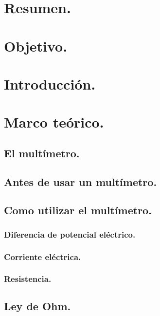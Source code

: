 \documentclass[10pt]{article}
\begin{document}
\tableofcontents
\newpage

\section{Resumen.}


\begin{multicols}{2}

\section{Objetivo.}



\section{Introducción.}



\section{Marco teórico.}

\subsection{El multímetro.}


\subsection{Antes de usar un multímetro.}


\subsection{Como utilizar el multímetro.}

\subsubsection{Diferencia de potencial eléctrico.}

\subsubsection{Corriente eléctrica.}


\subsubsection{Resistencia.}


\subsection{Ley de Ohm.}



\end{multicols}
\end{document}
